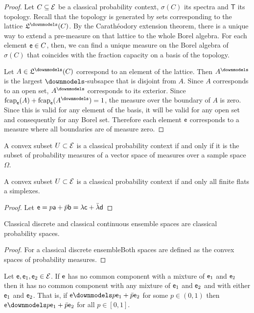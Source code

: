 \begin{proof}
	Let $C \subseteq \Ens$ be a classical probability context, $\sigma(C)$ its spectra and $\textsf{T}$ its topology. Recall that the topology is generated by sets corresponding to the lattice $\mathfrak{L}^\separate(C)$. By the Carathéodory extension theorem, there is a unique way to extend a pre-measure on that lattice to the whole Borel algebra. For each element $\ens \in C$, then, we can find a unique measure on the Borel algebra of $\sigma(C)$ that coincides with the fraction capacity on a basis of the topology.
	
	Let $A \in \mathfrak{L}^\separate(C)$ correspond to an element of the lattice. Then $A^\separate$ is the largest $\separate$-subsapce that is disjoint from $A$. Since $A$ corresponds to an open set, $A^\separate$ corresponds to its exterior. Since $\fcap_{\ens}(A) + \fcap_{\ens}(A^\separate) = 1$, the measure over the boundary of $A$ is zero. Since this is valid for any element of the basis, it will be valid for any open set and consequently for any Borel set. Therefore each element $\ens$ corresponds to a measure where all boundaries are of measure zero.
\end{proof}

\begin{prop}
	A convex subset $U \subset \Ens$ is a classical probability context if and only if it is the subset of probability measures of a vector space of measures over a sample space $\Omega$.
\end{prop}

\begin{prop}
	A convex subset $U \subset \Ens$ is a classical probability context if and only all finite flats a simplexes.
\end{prop}

\begin{proof}
	Let $\ens = p \ens[a] + \bar{p} \ens[b] = \lambda \ens[c] +\bar{\lambda} \ens[d]$
\end{proof}

\begin{coro}
	Classical discrete and classical continuous ensemble spaces are classical probability spaces.
\end{coro}

\begin{proof}
	For a classical discrete ensembleBoth spaces are defined as the convex spaces of probability measures.
\end{proof}

\begin{prop}\label{pm_es_separateExtendsMixtures}
	Let $\ens,\ens_1,\ens_2 \in \Ens$. If $\ens$ has no common component with a mixture of $\ens_1$ and $\ens_2$ then it has no common component with any mixture of $\ens_1$ and $\ens_2$ and with either $\ens_1$ and $\ens_2$. That is, if $\ens \separate p \ens_1 + \bar{p} \ens_2$ for some $p \in (0, 1)$ then $\ens \separate p \ens_1 + \bar{p} \ens_2$ for all $p \in [0, 1]$.
\end{prop}

